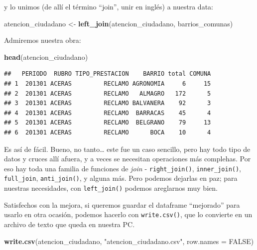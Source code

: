 \documentclass[spanish,]{book}
\newenvironment{Shaded}{\begin{snugshade}}{\end{snugshade}}
\newcommand{\DataTypeTok}[1]{\textcolor[rgb]{0.13,0.29,0.53}{#1}}
\newcommand{\KeywordTok}[1]{\textcolor[rgb]{0.13,0.29,0.53}{\textbf{#1}}}
\newcommand{\NormalTok}[1]{#1}
\newcommand{\OtherTok}[1]{\textcolor[rgb]{0.56,0.35,0.01}{#1}}
\newcommand{\StringTok}[1]{\textcolor[rgb]{0.31,0.60,0.02}{#1}}
\begin{document}
y lo unimos (de allí el término ``join'', unir en inglés) a nuestra data:

\begin{Shaded}
\begin{Highlighting}[]
\NormalTok{atencion_ciudadano <-}\StringTok{ }\KeywordTok{left_join}\NormalTok{(atencion_ciudadano, barrios_comunas)}
\end{Highlighting}
\end{Shaded}

Admiremos nuestra obra:

\begin{Shaded}
\begin{Highlighting}[]
\KeywordTok{head}\NormalTok{(atencion_ciudadano)}
\end{Highlighting}
\end{Shaded}

\begin{verbatim}
##   PERIODO  RUBRO TIPO_PRESTACION    BARRIO total COMUNA
## 1  201301 ACERAS         RECLAMO AGRONOMIA     6     15
## 2  201301 ACERAS         RECLAMO   ALMAGRO   172      5
## 3  201301 ACERAS         RECLAMO BALVANERA    92      3
## 4  201301 ACERAS         RECLAMO  BARRACAS    45      4
## 5  201301 ACERAS         RECLAMO  BELGRANO    79     13
## 6  201301 ACERAS         RECLAMO      BOCA    10      4
\end{verbatim}

Es así de fácil. Bueno, no tanto\ldots{} este fue un caso sencillo, pero hay todo tipo de datos y cruces allí afuera, y a veces se necesitan operaciones más complehas. Por eso hay toda una familia de funciones de \emph{join} - \texttt{right\_join()}, \texttt{inner\_join()}, \texttt{full\_join}, \texttt{anti\_join()}, y alguna más. Pero podemos dejarlas en paz; para nuestras necesidades, con \texttt{left\_join()} podemos areglarnos muy bien.

Satisfechos con la mejora, si queremos guardar el dataframe ``mejorado'' para usarlo en otra ocasión, podemos hacerlo con \texttt{write.csv()}, que lo convierte en un archivo de texto que queda en nuestra PC.

\begin{Shaded}
\begin{Highlighting}[]
\KeywordTok{write.csv}\NormalTok{(atencion_ciudadano, }\StringTok{"atencion_ciudadano.csv"}\NormalTok{, }\DataTypeTok{row.names =} \OtherTok{FALSE}\NormalTok{)}
\end{Highlighting}
\end{Shaded}
\end{document}

